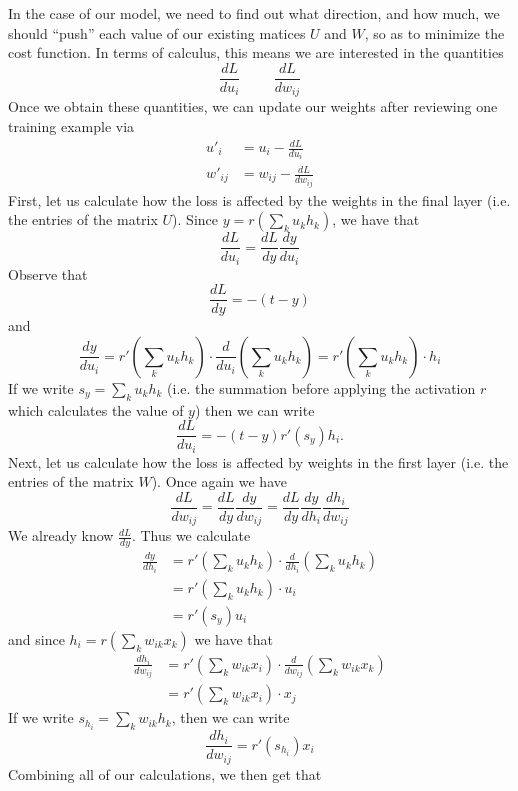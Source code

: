 \documentclass[12pt,letterpaper]{book}
\theoremstyle{definition}
\begin{document}
  In the case of our model, we need to find out what direction, and how much, we should ``push'' each 
  value of our existing matices $U$ and $W$, so as to minimize the cost function. 
  In terms of calculus, this means we are interested in the quantities 
  \[
      \frac{dL}{du_i} \hspace{1cm} \frac{dL}{dw_{ij}}
  \]
  Once we obtain these quantities, we can update our weights after reviewing one training
  example via
  \begin{align}
    u'_i &= u_i - \frac{dL}{du_i} \\
    w'_{ij}  &= w_{ij} - \frac{dL}{dw_{ij}}
  \end{align}
  First, let us calculate how the loss is affected by the weights in the final layer (i.e. the 
  entries of the matrix $U$). Since $y = r(\sum_{k}u_{k}h_k)$, we have that 
  \[
    \frac{dL}{du_i} = \frac{dL}{dy}\frac{dy}{du_i}
  \]
  Observe that 
  \[
    \frac{dL}{dy} = -(t - y)
  \]
  and 
  \[
    \frac{dy}{du_i} 
    = r'\left(\sum_{k}u_{k}h_k\right) \cdot \frac{d}{du_i}\left(\sum_{k}u_{k}h_k\right)
    = r'\left(\sum_{k}u_{k}h_k\right) \cdot h_i
  \]
  If we write $s_y = \sum_{k}u_kh_k$ (i.e. the summation before applying the activation $r$ 
  which calculates the value of $y$) then we can write
  \[
    \frac{dL}{du_i}
    = 
    -(t - y)r'(s_y)h_i.
  \]
  Next, let us calculate how the loss is affected by weights in the first layer (i.e. the entries 
  of the matrix $W$). Once again we have 
  \[
    \frac{dL}{dw_{ij}} = \frac{dL}{dy}\frac{dy}{dw_{ij}} = \frac{dL}{dy}\frac{dy}{dh_{i}}
    \frac{dh_i}{dw_{ij}} 
  \]
  We already know $\frac{dL}{dy}$. Thus we calculate 
  \begin{align}
    \frac{dy}{dh_{i}}
    &= r'\left(\sum_{k}u_{k}h_k\right) \cdot \frac{d}{dh_i}\left(\sum_{k}u_{k}h_k\right)\\
    &= r'\left(\sum_{k}u_{k}h_k\right) \cdot u_i\\
    &= r'(s_{y})u_i
  \end{align}
  and since $h_i = r\left( \sum_{k}w_{ik}x_k \right)$ we have that 
  \begin{align}
    \frac{dh_i}{dw_{ij}} 
    &= r'\left(\sum_{k}w_{ik}x_i\right) \cdot \frac{d}{dw_{ij}} \left( \sum_{k}w_{ik}x_k \right) \\
    &= r'\left(\sum_{k}w_{ik}x_i\right) \cdot x_j 
  \end{align}
  If we write $s_{h_i} = \sum_{k}w_{ik}h_k$, then we can write
  \[
    \frac{dh_i}{dw_{ij}} 
    = r'(s_{h_i})x_i
  \]
  Combining all of our calculations, we then get that 
\end{document}
